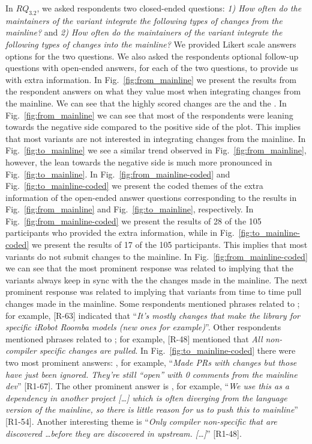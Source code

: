 \nd In $RQ_{3.2}$, we asked respondents two closed-ended questions: \textit{1) How often do the maintainers of the variant integrate the following types of changes from the mainline?} and\textit{ 2) How often do the maintainers of the variant integrate the following types of changes into the mainline?} We provided Likert scale answers options for the two questions. We also asked the respondents optional follow-up questions with open-ended answers, for each of the two questions, to provide us with extra information.
In Fig.~\ref{fig:from_mainline} we present the results from the respondent answers on what they value most when integrating changes from the mainline. We can see that the highly scored changes are the  and the . In Fig.~\ref{fig:from_mainline} we can see that most of the respondents were leaning towards the negative side compared to the positive side of the plot. 
This implies that most variants are not interested in integrating changes from the mainline.
In Fig.~\ref{fig:to_mainline} we see a similar trend observed in Fig.~\ref{fig:from_mainline}, however, the lean towards the negative side is much more pronounced in Fig.~\ref{fig:to_mainline}.
In Fig.~\ref{fig:from_mainline-coded} and Fig.~\ref{fig:to_mainline-coded} we present the coded themes of the extra information of the open-ended answer questions corresponding to the results in Fig.~\ref{fig:from_mainline} and Fig.~\ref{fig:to_mainline}, respectively. In Fig.~\ref{fig:from_mainline-coded} we present the results of 28 of the 105 participants who provided the extra information, while in Fig.~\ref{fig:to_mainline-coded} we present the results of 17 of the 105 participants. 
This implies that most variants do not submit changes to the mainline.
In Fig.~\ref{fig:from_mainline-coded} we can see that the most prominent response was related to  implying that the variants always keep in sync with the the changes made in the mainline. The next prominent response was related to  implying that variants from time to time pull changes made in the mainline. Some respondents mentioned phrases related to ; for example, [R-63] indicated that ``\emph{It's mostly changes that make the library for specific iRobot Roomba models (new ones for example)}''. Other respondents mentioned phrases related to ; for example, [R-48] mentioned that \emph{All non-compiler specific changes are pulled}.
In Fig.~\ref{fig:to_mainline-coded} there were two most prominent answers: , for example, ``\textit{Made PRs with changes but those have just been ignored. They're still ``open'' with 0 comments from the mainline dev}'' [R1-67]. The other prominent answer is , for example, ``\emph{We use this as a dependency in another project [\ldots] which is often diverging from the language version of the mainline, so there is little reason for us to push this to mainline}'' [R1-54]. Another interesting theme is ``\emph{Only compiler non-specific that are discovered \ldots before they are discovered in upstream. [\ldots]}'' [R1-48].

